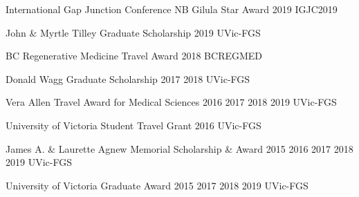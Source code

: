 



\begin{cvhonors}

  \cvhonor
    {International Gap Junction Conference NB Gilula Star Award} %
    {2019} %
    {IGJC2019} %
    {} %

  \cvhonor
    {John \& Myrtle Tilley Graduate Scholarship} %
    {2019} %
    {UVic-FGS} %
    {} %

  \cvhonor
    {BC Regenerative Medicine Travel Award} %
    {2018} %
    {BCREGMED} %
    {} %

  \cvhonor
    {Donald Wagg Graduate Scholarship} %
    {2017 2018} %
    {UVic-FGS} %
    {} %

  \cvhonor
    {Vera Allen Travel Award for Medical Sciences} %
    {2016 2017 2018 2019} %
    {UVic-FGS} %
    {} %

  \cvhonor
    {University of Victoria Student Travel Grant} %
    {2016} %
    {UVic-FGS} %
    {} %

  \cvhonor
    {James A. \& Laurette Agnew Memorial Scholarship \& Award} %
    {2015 2016 2017 2018 2019} %
    {UVic-FGS} %
    {} %

  \cvhonor
    {University of Victoria Graduate Award} %
    {2015 2017 2018 2019} %
    {UVic-FGS} %
    {} %


\end{cvhonors}
